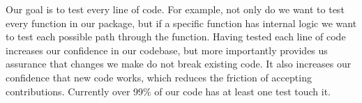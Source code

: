 %

%
%



Our goal is to test every line of code.  For example, not only do we want to
test every function in our package, but if a specific function has internal
logic we want to test each possible path through the function.  Having tested
each line of code increases our confidence in our codebase, but more
importantly provides us assurance that changes we make do not break existing
code.  It also increases our confidence that new code works, which reduces the
friction of accepting contributions.  Currently over 99\% of our code has at
least one test touch it.

%
%


